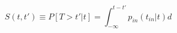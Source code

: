\begin{equation}
S(t,t') \equiv P[T> t'|t] = \int_{-\infty}^{t-t'} p_{in}(t_{in}|t) d
\end{equation}